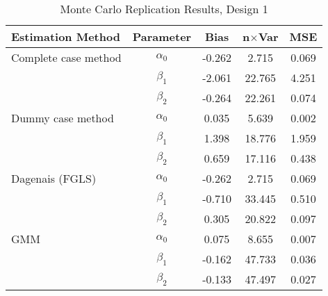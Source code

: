 \begin{table}
\centering
\caption{Monte Carlo Replication Results, Design 1}
\label{table:MCReplicationResultsDesign1}
\begin{tabular}{lcccc}
\toprule
Estimation Method & Parameter & Bias & n$\times$Var & MSE \\
\midrule
Complete case method & $\alpha_0$ & -0.262 & 2.715 & 0.069 \\
 & $\beta_1$ & -2.061 & 22.765 & 4.251 \\
 & $\beta_2$ & -0.264 & 22.261 & 0.074 \\
Dummy case method & $\alpha_0$ & 0.035 & 5.639 & 0.002 \\
 & $\beta_1$ & 1.398 & 18.776 & 1.959 \\
 & $\beta_2$ & 0.659 & 17.116 & 0.438 \\
Dagenais (FGLS) & $\alpha_0$ & -0.262 & 2.715 & 0.069 \\
 & $\beta_1$ & -0.710 & 33.445 & 0.510 \\
 & $\beta_2$ & 0.305 & 20.822 & 0.097 \\
GMM & $\alpha_0$ & 0.075 & 8.655 & 0.007 \\
 & $\beta_1$ & -0.162 & 47.733 & 0.036 \\
 & $\beta_2$ & -0.133 & 47.497 & 0.027 \\
\bottomrule
\end{tabular}
\end{table}
